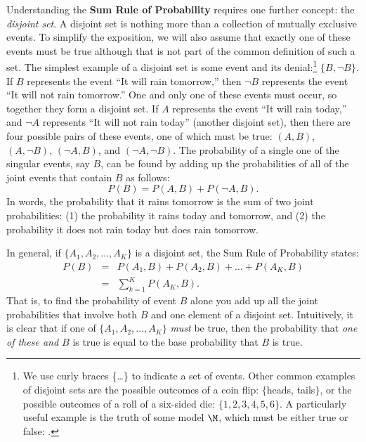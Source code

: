 Understanding the \textbf{Sum Rule of Probability} requires one further concept: the \emph{disjoint set}.  A disjoint set is nothing more than a collection of {mutually exclusive} events. {To simplify the exposition, we will also assume that exactly one of these events must be true although that is not part of the common definition of such a set.}  The simplest example of a {disjoint} set is some event and its denial:\footnote{We use curly braces \{\ldots\} to indicate a set of events. Other common examples of disjoint sets are the possible outcomes of a coin flip: $\{$heads, tails$\}$, or the possible outcomes of a roll of a six-sided die: $\{1, 2, 3, 4, 5, 6\}$. A particularly useful example is the truth of some model $\M$, which must be either true or false: \rem{$\{\M, \alt{\M}\}$}{$\{\M, \neg{\M}\}$}.} $\{B, \neg{B}\}$. If $B$ represents the event ``It will rain tomorrow,'' then $\neg{B}$ represents the event ``It will not rain tomorrow.'' One and only one of these events must occur, so together they form a disjoint set. If $A$ represents the event ``It will rain today,'' and $\neg{A}$ represents ``It will not rain today'' (another disjoint set), then there are four possible pairs of these events, one of which must be true: $(A,B)$, $(A,\neg{B})$, $(\neg{A},B)$, and $(\neg{A},\neg{B})$. The probability of a single one of the singular events, say $B$, can be found by adding up the probabilities of all of the joint events that contain $B$ as follows:
$${P(B) = P(A,B) + P(\neg A, B)}.$$
In words, the probability that it rains tomorrow is the sum of two joint probabilities: (1) the probability it rains today and tomorrow, and (2) the probability it does not rain today but does rain tomorrow. 

In general, if $\{A_1, A_2, \ldots, A_K\}$ is a disjoint set, the Sum Rule of Probability states:
\begin{equation}
\begin{array}{rcl}
P(B) &=&P(A_1,B)+P(A_2,B)+\ldots+P(A_K,B)\\ &=&\displaystyle\sum_{k=1}^K P(A_K,B).
\label{eq:sumrule}
\end{array}
\end{equation}
That is, to find the probability of event $B$ alone you add up all the joint probabilities that involve both $B$ and one element of a disjoint set. Intuitively, it is clear that if one of $\{A_1, A_2, \ldots, A_K\}$ \emph{must} be true, then the probability that \emph{one of these and $B$} is true is equal to the base probability that $B$ is true. 


